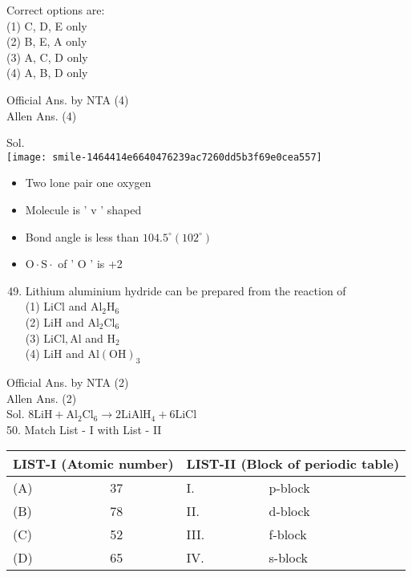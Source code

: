 \documentclass[10pt]{article}
\begin{document}
Correct options are:\\
(1) C, D, E only\\
(2) B, E, A only\\
(3) A, C, D only\\
(4) A, B, D only

Official Ans. by NTA (4)\\
Allen Ans. (4)

Sol.\\
\texttt{[image: smile-1464414e6640476239ac7260dd5b3f69e0cea557]}

\begin{itemize}
  \item Two lone pair one oxygen
  \item Molecule is ' v ' shaped
  \item Bond angle is less than \(104.5^{\circ}\left(102^{\circ}\right)\)
  \item \(\mathrm{O} \cdot \mathrm{S} \cdot\) of ' O ' is +2
\end{itemize}

\begin{enumerate}
  \setcounter{enumi}{48}
  \item Lithium aluminium hydride can be prepared from the reaction of\\
(1) LiCl and \(\mathrm{Al}_{2} \mathrm{H}_{6}\)\\
(2) LiH and \(\mathrm{Al}_{2} \mathrm{Cl}_{6}\)\\
(3) \(\mathrm{LiCl}, \mathrm{Al}\) and \(\mathrm{H}_{2}\)\\
(4) LiH and \(\mathrm{Al}(\mathrm{OH})_{3}\)
\end{enumerate}

Official Ans. by NTA (2)\\
Allen Ans. (2)\\
Sol. \(8 \mathrm{LiH}+\mathrm{Al}_{2} \mathrm{Cl}_{6} \longrightarrow 2 \mathrm{LiAlH}_{4}+6 \mathrm{LiCl}\)\\
50. Match List - I with List - II

\begin{center}
\begin{tabular}{|l|l|l|l|}
\hline
\multicolumn{2}{|r|}{LIST-I (Atomic number)} & \multicolumn{2}{|r|}{LIST-II (Block of periodic table)} \\
\hline
(A) & 37 & I. & p-block \\
\hline
(B) & 78 & II. & d-block \\
\hline
(C) & 52 & III. & f-block \\
\hline
(D) & 65 & IV. & s-block \\
\hline
\end{tabular}
\end{center}
\end{document}
